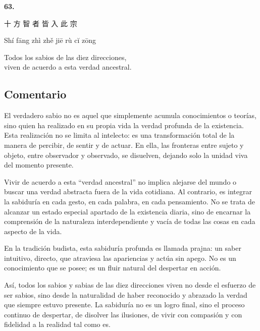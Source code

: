 \documentclass[
  a5paperpaper,
]{article}
\begin{document}
\hfill\break

\hypertarget{03}{}
\begin{verseblock}

\newpage

\begin{center}\textbf{63.}\end{center}

十 方 智 者 皆 入 此 宗

Shí fāng zhì zhě jiē rù cĭ zōng

Todos los sabios de las diez direcciones,\\
viven de acuerdo a esta verdad ancestral.

\end{verseblock}

\hfill\break

\hypertarget{comentario-62}{%
\subsection{Comentario}\label{comentario-62}}

El verdadero sabio no es aquel que simplemente acumula conocimientos o
teorías, sino quien ha realizado en su propia vida la verdad profunda de
la existencia. Esta realización no se limita al intelecto: es una
transformación total de la manera de percibir, de sentir y de actuar. En
ella, las fronteras entre sujeto y objeto, entre observador y observado,
se disuelven, dejando solo la unidad viva del momento presente.

Vivir de acuerdo a esta ``verdad ancestral'' no implica alejarse del
mundo o buscar una verdad abstracta fuera de la vida cotidiana. Al
contrario, es integrar la sabiduría en cada gesto, en cada palabra, en
cada pensamiento. No se trata de alcanzar un estado especial apartado de
la existencia diaria, sino de encarnar la comprensión de la naturaleza
interdependiente y vacía de todas las cosas en cada aspecto de la vida.

En la tradición budista, esta sabiduría profunda es llamada prajna: un
saber intuitivo, directo, que atraviesa las apariencias y actúa sin
apego. No es un conocimiento que se posee; es un fluir natural del
despertar en acción.

Así, todos los sabios y sabias de las diez direcciones viven no desde el
esfuerzo de ser sabios, sino desde la naturalidad de haber reconocido y
abrazado la verdad que siempre estuvo presente. La sabiduría no es un
logro final, sino el proceso continuo de despertar, de disolver las
ilusiones, de vivir con compasión y con fidelidad a la realidad tal como
es.
\end{document}
